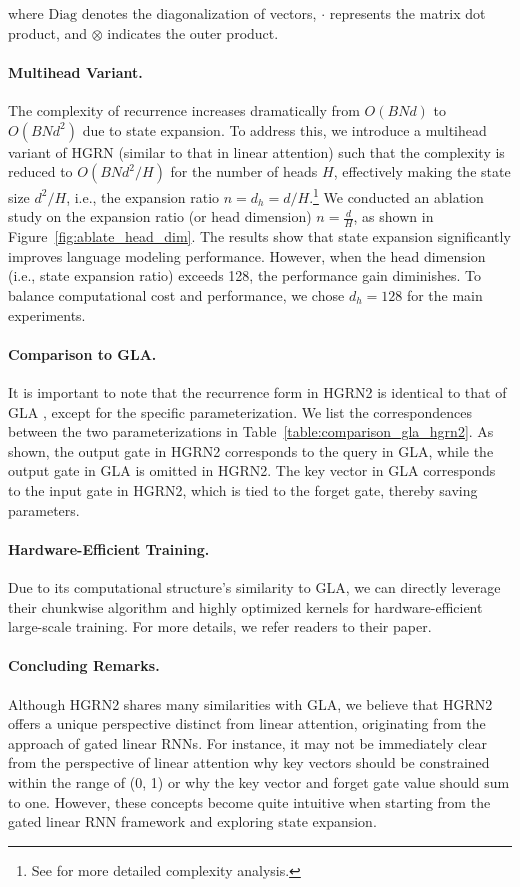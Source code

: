 where \(\mathrm{Diag}\) denotes the diagonalization of vectors, \(\cdot\) represents the matrix dot product, and \(\otimes\) indicates the outer product.

\paragraph{Multihead Variant.} The complexity of recurrence increases dramatically from \(O(BNd)\) to \(O(BNd^2)\) due to state expansion. To address this, we introduce a multihead variant of HGRN (similar to that in linear attention) such that the complexity is reduced to \(O(BNd^2/H)\) for the number of heads \(H\), effectively making the state size \(d^2/H\), i.e., the expansion ratio \(n = d_h = d/H\).\footnote{See \cite{Bolya2022HydraAE} for more detailed complexity analysis.} We conducted an ablation study on the expansion ratio (or head dimension) \(n = \frac{d}{H}\), as shown in Figure~\ref{fig:ablate_head_dim}. The results show that state expansion significantly improves language modeling performance. However, when the head dimension (i.e., state expansion ratio) exceeds 128, the performance gain diminishes. To balance computational cost and performance, we chose \(d_h = 128\) for the main experiments.

\paragraph{Comparison to GLA.} It is important to note that the recurrence form in HGRN2 is identical to that of GLA \citep{GLA}, except for the specific parameterization. We list the correspondences between the two parameterizations in Table~\ref{table:comparison_gla_hgrn2}. As shown, the output gate in HGRN2 corresponds to the query in GLA, while the output gate in GLA is omitted in HGRN2. The key vector in GLA corresponds to the input gate in HGRN2, which is tied to the forget gate, thereby saving parameters.

\paragraph{Hardware-Efficient Training.} Due to its computational structure's similarity to GLA, we can directly leverage their chunkwise algorithm and highly optimized kernels for hardware-efficient large-scale training. For more details, we refer readers to their paper.

\paragraph{Concluding Remarks.} Although HGRN2 shares many similarities with GLA, we believe that HGRN2 offers a unique perspective distinct from linear attention, originating from the approach of gated linear RNNs. For instance, it may not be immediately clear from the perspective of linear attention why key vectors should be constrained within the range of (0, 1) or why the key vector and forget gate value should sum to one. However, these concepts become quite intuitive when starting from the gated linear RNN framework and exploring state expansion.

